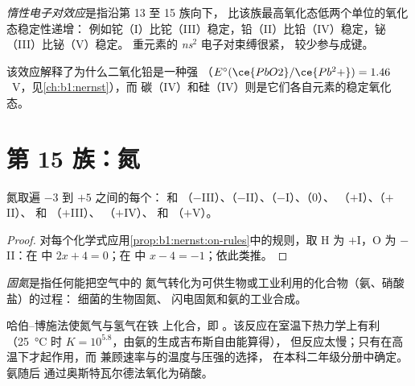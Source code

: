 \begin{definition}[惰性电子对效应]\label{def:b1:p-block-13-15:inert-pair}
\emph{惰性电子对效应}是指沿第 13 至 15 族向下，
比该族最高氧化态低两个单位的氧化态稳定性递增：
例如铊（I）比铊（III）稳定，铅（II）比铅（IV）稳定，铋（III）比铋（V）稳定。
重元素的 \textit{ns}$^2$ 电子对束缚很紧，
较少参与成键。
\end{definition}

该效应解释了为什么二氧化铅是一种强
（$E^\circ(\ce{PbO2}/\ce{Pb^2+}) = 1.46$~V，见\cref{ch:b1:nernst}），而
碳（IV）和硅（IV）则是它们各自元素的稳定氧化态。

\section{第 15 族：氮}

\begin{proposition}[氮的阶梯]\label{prop:b1:p-block-13-15:nitrogen-ladder}
氮取遍 $-3$ 到 $+5$ 之间的每个： 和
（$-$III）、（$-$II）、（$-$I）、（0）、
（$+$I）、（$+$II）、 和 （$+$III）、
（$+$IV）、 和 （$+$V）。
\end{proposition}

\begin{proof}
对每个化学式应用\cref{prop:b1:nernst:on-rules}中的规则，取 H 为
$+$I，O 为 $-$II：在  中 $2x + 4 = 0$；在  中 $x - 4 =
-1$；依此类推。
\end{proof}

\begin{definition}[固氮]\label{def:b1:p-block-13-15:nitrogen-fixation}
\emph{固氮}是指任何能把空气中的
氮气转化为可供生物或工业利用的化合物（氨、硝酸盐）的过程：
细菌的生物固氮、
闪电固氮和氨的工业合成。
\end{definition}

哈伯–博施法使氮气与氢气在铁
上化合，即 。该反应在室温下热力学上有利
（\qty{25}{\celsius} 时 $K = 10^{5.8}$，由氨的生成吉布斯自由能算得），
但反应太慢；只有在高温下才起作用，而
兼顾速率与的温度与压强的选择，
在本科二年级分册中确定。氨随后
通过奥斯特瓦尔德法氧化为硝酸。

